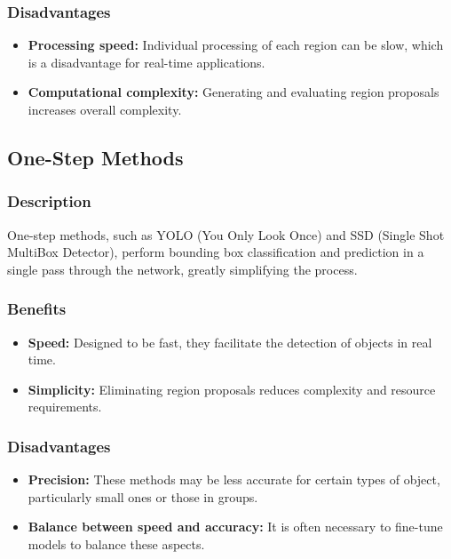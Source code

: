 \documentclass[12pt,oneside]{book} %
\begin{document}
\subsubsection{Disadvantages}

\begin{itemize}
    \item \textbf{Processing speed:} Individual processing of each region can be slow, which is a disadvantage for real-time applications.
    \item \textbf{Computational complexity:} Generating and evaluating region proposals increases overall complexity.
\end{itemize}

\subsection{One-Step Methods}

\subsubsection{Description}
One-step methods, such as YOLO (You Only Look Once) and SSD (Single Shot
MultiBox Detector), perform bounding box classification and prediction in a
single pass through the network, greatly simplifying the process.

\subsubsection{Benefits}

\begin{itemize}
    \item \textbf{Speed:} Designed to be fast, they facilitate the detection of objects in real time.
    \item \textbf{Simplicity:} Eliminating region proposals reduces complexity and resource requirements.
\end{itemize}

\subsubsection{Disadvantages}

\begin{itemize}
    \item \textbf{Precision:} These methods may be less accurate for certain types of object, particularly small ones or those in groups.
    \item \textbf{Balance between speed and accuracy:} It is often necessary to fine-tune models to balance these aspects.
\end{itemize}
\end{document}

